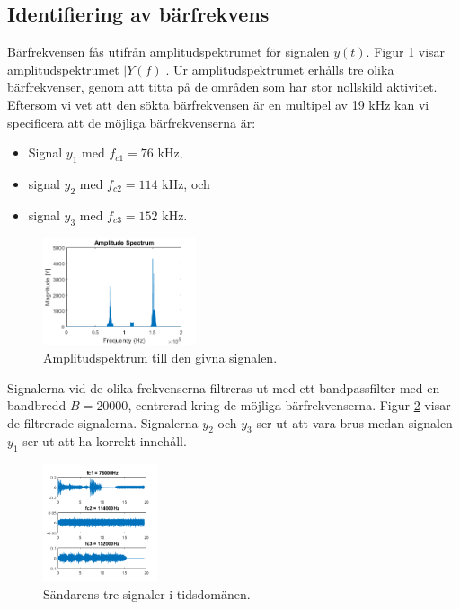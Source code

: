\documentclass[10pt,twocolumn]{article}
\begin{document}
\subsection{Identifiering av bärfrekvens}

Bärfrekvensen fås utifrån amplitudspektrumet för signalen $y(t)$. Figur \ref{ampl} visar amplitudspektrumet $|Y(f)|$. Ur amplitudspektrumet erhålls tre olika bärfrekvenser, genom att titta på de områden som har stor nollskild aktivitet. Eftersom vi vet att den sökta bärfrekvensen är en multipel av 19 kHz kan vi specificera att de möjliga bärfrekvenserna är:

\begin{itemize}

	\item Signal $y_1$ med $f_{c1} = 76$ kHz,
	\item signal $y_2$ med $f_{c2} = 114$ kHz, och
	\item signal $y_3$ med $f_{c3} = 152$ kHz.

\end{itemize}

\begin{figure}[H]
	\centering
	\includegraphics[width=0.4\textwidth]{figures/Figure1.png}
	\caption{Amplitudspektrum till den givna signalen.}
	\label{ampl}
\end{figure}

Signalerna vid de olika frekvenserna filtreras ut med ett bandpassfilter med en bandbredd $B = 20000$, centrerad kring de möjliga bärfrekvenserna.
Figur \ref{filtered} visar de filtrerade signalerna. Signalerna $y_2$ och $y_3$ ser ut att vara brus medan signalen $y_1$ ser ut att ha korrekt innehåll.

\begin{figure}[H]
	\centering
	\includegraphics[width=0.3\textwidth]{figures/Figure2.png}
	\caption{Sändarens tre signaler i tidsdomänen. }
	\label{filtered}
\end{figure}
\end{document}
